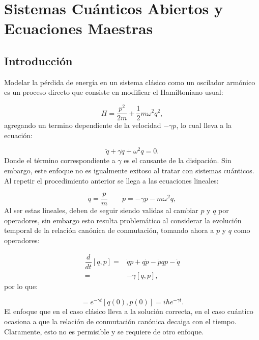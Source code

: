 \documentclass[a4paper,10pt]{report}
\begin{document}
\chapter{Sistemas Cuánticos Abiertos y Ecuaciones Maestras}

\section{Introducción}

Modelar la pérdida de energía en un sistema clásico como un oscilador armónico es un proceso directo \cite{CarmichaelQO} que consiste en modificar el Hamiltoniano usual:

\begin{equation}
H = \frac{p^2}{2m} + \frac{1}{2} m\omega^2 q^2,
\end{equation} agregando un termino dependiente de la velocidad $-\gamma p$, lo cual lleva a la ecuación:

\begin{equation}
\ddot{q} + \gamma \dot{q} + \omega^2 q = 0.
\end{equation}Donde el término correspondiente a $\gamma$ es el causante de la disipación. Sin embargo, este enfoque no es igualmente exitoso al tratar con sistemas cuánticos. Al repetir el procedimiento anterior se llega a las ecuaciones lineales:

\begin{equation}
\dot{q} = \frac{p}{m} \qquad \dot{p} = -\gamma p -m\omega ^2 q,
\end{equation}Al ser estas lineales, deben de seguir siendo validas al cambiar $p$ y $q$ por operadores, sin embargo esto resulta problemático al considerar la evolución temporal de la relación canónica de conmutación, tomando ahora a $p$ y $q$ como operadores:

\begin{align*}
 \dfrac{d}{dt}[q,p] =& \dot{q}p + q\dot{p} - \dot{p}q p-\dot{q}\\  
 =& -\gamma[q,p],
\end{align*}por lo que:

\begin{equation}
[q(t),p(t)] = e^{-\gamma t}[q(0),p(0)] = i\hbar e^{-\gamma t}.
\end{equation} El enfoque que en el caso clásico lleva a la solución correcta, en el caso cuántico ocasiona a que la relación de conmutación canónica decaiga con el tiempo. Claramente, esto no es permisible y se requiere de otro enfoque.
\end{document}
